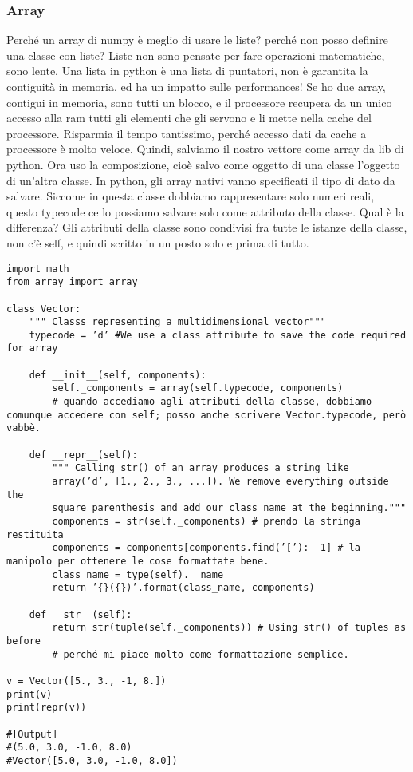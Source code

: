 \documentclass[10pt, a4paper, titlepage]{book}
\begin{document}
\subsubsection{Array}

Perché un array di numpy è meglio di usare le liste? perché non posso definire una classe con liste? Liste non sono pensate per fare operazioni matematiche, sono lente.
Una lista in python è una lista di puntatori, non è garantita la contiguità in memoria, ed ha un impatto sulle performances!
Se ho due array, contigui in memoria, sono tutti un blocco, e il processore recupera da un unico accesso alla ram tutti gli elementi che gli servono e li mette nella cache del processore.
Risparmia il tempo tantissimo, perché accesso dati da cache a processore è molto veloce.
Quindi, salviamo il nostro vettore come array da lib di python. 
Ora uso la composizione, cioè salvo come oggetto di una classe l'oggetto di un'altra classe.
In python, gli array nativi vanno specificati il tipo di dato da salvare.
Siccome in questa classe dobbiamo rappresentare solo numeri reali, questo typecode ce lo possiamo salvare solo come attributo della classe.
Qual è la differenza? 
Gli attributi della classe sono condivisi fra tutte le istanze della classe, non c'è self, e quindi scritto in un posto solo e prima di tutto.

\begin{verbatim}
import math
from array import array

class Vector:
	""" Classs representing a multidimensional vector"""
	typecode = ’d’ #We use a class attribute to save the code required for array

	def __init__(self, components):
		self._components = array(self.typecode, components)
		# quando accediamo agli attributi della classe, dobbiamo comunque accedere con self; posso anche scrivere Vector.typecode, però vabbè.

	def __repr__(self):
		""" Calling str() of an array produces a string like
		array(’d’, [1., 2., 3., ...]). We remove everything outside the
		square parenthesis and add our class name at the beginning."""
		components = str(self._components) # prendo la stringa restituita
		components = components[components.find(’[’): -1] # la manipolo per ottenere le cose formattate bene.
		class_name = type(self).__name__
		return ’{}({})’.format(class_name, components)

	def __str__(self):
		return str(tuple(self._components)) # Using str() of tuples as before
		# perché mi piace molto come formattazione semplice.

v = Vector([5., 3., -1, 8.])
print(v)
print(repr(v))

#[Output]
#(5.0, 3.0, -1.0, 8.0)
#Vector([5.0, 3.0, -1.0, 8.0])	
\end{verbatim}
\end{document}
